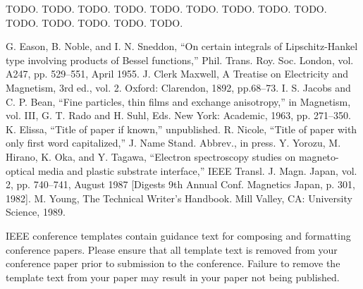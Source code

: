 \documentclass[conference]{IEEEtran}
\begin{document}
\begin{thebibliography}{00}

 TODO.
 TODO.
 TODO.
 TODO.
 TODO.
 TODO.
 TODO.
 TODO.
 TODO.
 TODO.
 TODO.
 TODO.
 TODO.
 TODO.

 G. Eason, B. Noble, and I. N. Sneddon, ``On certain integrals of Lipschitz-Hankel type involving products of Bessel functions,'' Phil. Trans. Roy. Soc. London, vol. A247, pp. 529--551, April 1955.
 J. Clerk Maxwell, A Treatise on Electricity and Magnetism, 3rd ed., vol. 2. Oxford: Clarendon, 1892, pp.68--73.
 I. S. Jacobs and C. P. Bean, ``Fine particles, thin films and exchange anisotropy,'' in Magnetism, vol. III, G. T. Rado and H. Suhl, Eds. New York: Academic, 1963, pp. 271--350.
 K. Elissa, ``Title of paper if known,'' unpublished.
 R. Nicole, ``Title of paper with only first word capitalized,'' J. Name Stand. Abbrev., in press.
 Y. Yorozu, M. Hirano, K. Oka, and Y. Tagawa, ``Electron spectroscopy studies on magneto-optical media and plastic substrate interface,'' IEEE Transl. J. Magn. Japan, vol. 2, pp. 740--741, August 1987 [Digests 9th Annual Conf. Magnetics Japan, p. 301, 1982].
 M. Young, The Technical Writer's Handbook. Mill Valley, CA: University Science, 1989.
\end{thebibliography}
\vspace{12pt}
\color{red}
IEEE conference templates contain guidance text for composing and formatting conference papers. Please ensure that all template text is removed from your conference paper prior to submission to the conference. Failure to remove the template text from your paper may result in your paper not being published.
\end{document}
